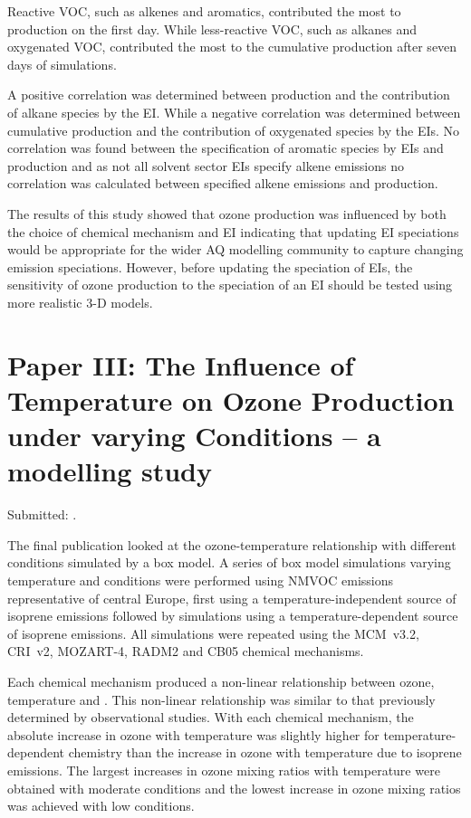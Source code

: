Reactive VOC, such as alkenes and aromatics, contributed the most to  production on the first day.
While less-reactive VOC, such as alkanes and oxygenated VOC, contributed the most to the cumulative  production after seven days of simulations. 

A positive correlation was determined between  production and the contribution of alkane species by the EI.
While a negative correlation was determined between cumulative  production and the contribution of oxygenated species by the EIs.
No correlation was found between the specification of aromatic species by EIs and  production and as not all solvent sector EIs specify alkene emissions no correlation was calculated between specified alkene emissions and  production.

The results of this study showed that ozone production was influenced by both the choice of chemical mechanism and EI indicating that updating EI speciations would be appropriate for the wider AQ modelling community to capture changing emission speciations.
However, before updating the speciation of EIs, the sensitivity of ozone production to the speciation of an EI should be tested using more realistic 3-D models.

\vspace{-2mm}
\singlespacing
\section{Paper III: The Influence of Temperature on Ozone Production under varying  Conditions -- a modelling study} \label{s:T-O3_results}
\onehalfspacing

\vspace{-2mm}
\noindent
Submitted: .
\vspace{3mm}

The final publication looked at the ozone-temperature relationship with different  conditions simulated by a box model.
A series of box model simulations varying temperature and  conditions were performed using NMVOC emissions representative of central Europe, first using a temperature-independent source of isoprene emissions followed by simulations using a temperature-dependent source of isoprene emissions.
All simulations were repeated using the MCM~v3.2, CRI~v2, MOZART-4, RADM2 and CB05 chemical mechanisms.

Each chemical mechanism produced a non-linear relationship between ozone, temperature and .
This non-linear relationship was similar to that previously determined by observational studies.  
With each chemical mechanism, the absolute increase in ozone with temperature was slightly higher for temperature-dependent chemistry than the increase in ozone with temperature due to isoprene emissions.
The largest increases in ozone mixing ratios with temperature were obtained with moderate  conditions and the lowest increase in ozone mixing ratios was achieved with low  conditions.


